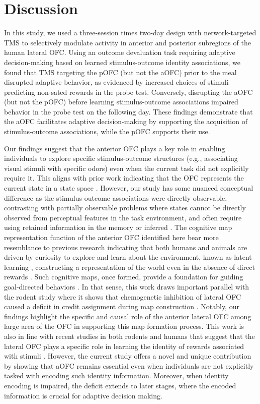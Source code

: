 \documentclass[lineno,sn-basic]{sn-jnl}%
\begin{document}
\section{Discussion}
\label{sec:discuss}

In this study, we used a three-session times two-day design with network-targeted TMS to selectively modulate activity in anterior and posterior subregions of the human lateral OFC. Using an outcome devaluation task requiring adaptive decision-making based on learned stimulus-outcome identity associations, we found that TMS targeting the pOFC (but not the
aOFC) prior to the meal disrupted adaptive behavior, as evidenced by increased choices of stimuli predicting non-sated rewards in the probe test. Conversely, disrupting the aOFC (but not the pOFC) before learning stimulus-outcome associations impaired behavior in the probe test on the following day. These findings demonstrate that the aOFC facilitates
adaptive decision-making by supporting the acquisition of stimulus-outcome associations, while the pOFC supports their use.



Our findings suggest that the anterior OFC plays a key role in enabling individuals to explore specific stimulus-outcome structures (e.g., associating visual stimuli with specific odors) even when the current task did not explicitly require it. This aligns with prior work indicating that the OFC represents the current state in a state space
\citep{RN606,RN643}. However, our study has some nuanced conceptual difference as the stimulus-outcome associations were directly observable, contrasting with partially observable problems where states cannot be directly observed from perceptual features in the task environment, and often require using retained information in the memory or inferred \citep[e.g.][]{RN642,RN457}. The cognitive map representation function of the anterior OFC identified here bear more resemblance to previous research indicating that both humans and animals are driven by curiosity to explore and learn about the environment, known as latent learning \citep{RN633,RN592}, constructing a representation of the world even in the absence of direct rewards \citep{RN633,RN614,RN634}.
Such cognitive maps, once formed, provide a foundation for guiding
goal-directed behaviors \citep{behmulwhi18,RN592}. In that sense, this work draws important parallel with the rodent study where it shows that chemogenetic inhibition of lateral OFC caused a deficit in credit assignment during map construction \citep{RN598}. Notably, our findings highlight the specific and causal role of the anterior lateral OFC among large area of the OFC in supporting this map formation process. This work is also in line with recent studies in both rodents and humans that suggest that the lateral OFC plays a specific role in learning the identity of rewards associated with stimuli
\citep{RN598,RN30,RN28,liuyaoatt24,RN650,RN451}. However, the current study offers a
novel and unique contribution by showing that aOFC remains essential even when individuals are not explicitly tasked with encoding such identity information. Moreover, when identity encoding is impaired, the deficit extends to later stages, where the encoded information is crucial for adaptive decision making.
\end{document}

